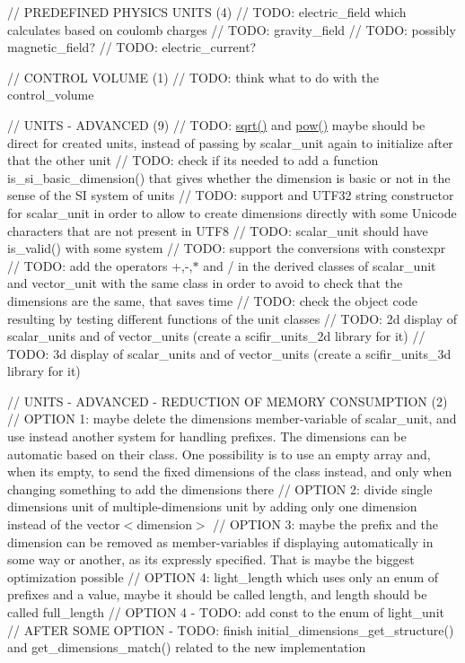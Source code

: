 // PREDEFINED PHYSICS UNITS (4) // TODO\+: electric\+\_\+field which calculates based on coulomb charges // TODO\+: gravity\+\_\+field // TODO\+: possibly magnetic\+\_\+field? // TODO\+: electric\+\_\+current?

// CONTROL VOLUME (1) // TODO\+: think what to do with the control\+\_\+volume

// UNITS -\/ ADVANCED (9) // TODO\+: \mbox{\hyperlink{namespacescifir_adeff4b825414d35ce963977f181f1b5c}{sqrt()}} and \mbox{\hyperlink{namespacescifir_a44533727ef4f03e8303664cdd665c2bc}{pow()}} maybe should be direct for created units, instead of passing by scalar\+\_\+unit again to initialize after that the other unit // TODO\+: check if it\textquotesingle{}s needed to add a function is\+\_\+si\+\_\+basic\+\_\+dimension() that gives whether the dimension is basic or not in the sense of the SI system of units // TODO\+: support and UTF32 string constructor for scalar\+\_\+unit in order to allow to create dimensions directly with some Unicode characters that are not present in UTF8 // TODO\+: scalar\+\_\+unit should have is\+\_\+valid() with some system // TODO\+: support the conversions with constexpr // TODO\+: add the operators +,-\/,$\ast$ and / in the derived classes of scalar\+\_\+unit and vector\+\_\+unit with the same class in order to avoid to check that the dimensions are the same, that saves time // TODO\+: check the object code resulting by testing different functions of the unit classes // TODO\+: 2d display of scalar\+\_\+units and of vector\+\_\+units (create a scifir\+\_\+units\+\_\+2d library for it) // TODO\+: 3d display of scalar\+\_\+units and of vector\+\_\+units (create a scifir\+\_\+units\+\_\+3d library for it)

// UNITS -\/ ADVANCED -\/ REDUCTION OF MEMORY CONSUMPTION (2) // OPTION 1\+: maybe delete the dimensions member-\/variable of scalar\+\_\+unit, and use instead another system for handling prefixes. The dimensions can be automatic based on their class. One possibility is to use an empty array and, when it\textquotesingle{}s empty, to send the fixed dimensions of the class instead, and only when changing something to add the dimensions there // OPTION 2\+: divide single dimensions unit of multiple-\/dimensions unit by adding only one dimension instead of the vector$<$dimension$>$ // OPTION 3\+: maybe the prefix and the dimension can be removed as member-\/variables if displaying automatically in some way or another, as it\textquotesingle{}s expressly specified. That is maybe the biggest optimization possible // OPTION 4\+: light\+\_\+length which uses only an enum of prefixes and a value, maybe it should be called length, and length should be called full\+\_\+length // OPTION 4 -\/ TODO\+: add const to the enum of light\+\_\+unit // AFTER SOME OPTION -\/ TODO\+: finish initial\+\_\+dimensions\+\_\+get\+\_\+structure() and get\+\_\+dimensions\+\_\+match() related to the new implementation

